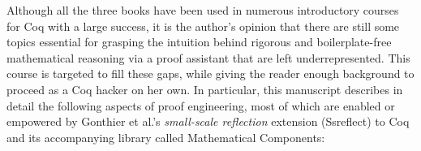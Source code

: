 Although all the three books have been used in numerous introductory courses for Coq with a large success, it is the author's opinion that there are still some topics essential for grasping the intuition behind rigorous and boilerplate-free mathematical reasoning via a proof assistant that are left underrepresented. This course is targeted to fill these gaps, while giving the reader enough background to proceed as a Coq hacker on her own. In particular, this manuscript describes in detail the following aspects of proof engineering, most of which are enabled or empowered by Gonthier et al.'s \textit{small-scale reflection} extension (Ssreflect) to Coq~\cite{Gontier-al:TR} and its accompanying library called Mathematical Components:





